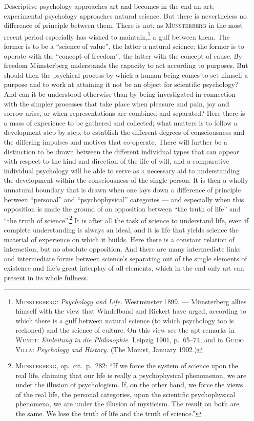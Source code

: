 \documentclass[12pt,a4paper]{book}
\newcommand{\opage}[1]{\marginnote{\footnotesize\textit{[#1]}}}
\begin{document}
Descriptive psychology approaches art and becomes in the end an art;
experimental psychology approaches natural science. But there is nevertheless no
difference of principle between them. There is not, as \textsc{Münsterberg} in
the most recent period especially has wished to maintain,\footnote{%
\textsc{Münsterberg}: \textit{Psychology and Life.} Westminster 1899. ---
Münsterberg allies himself with the view that Windelband and Rickert have
urged, according to which there is a gulf between natural science (to which
psychology too is reckoned) and the science of culture. On this view see the
apt remarks in \textsc{Wundt}: \textit{Einleitung in die Philosophie.} Leipzig
1901, p.~65--74, and in \textsc{Guido Villa}: \textit{Psychology and History.}
(The Monist, January 1902.)} a gulf between them. The former is to be a
``science of value'', the latter a natural science; the former is to operate
with the ``concept of freedom'', the latter with the concept of cause. By
freedom Münsterberg understands the capacity to act according to purposes. But
should then the psychical process by which a human being comes to set himself a
purpose and to work at attaining it not be an object for scientific psychology?
And can it be understood otherwise than by being investigated in connection with
the simpler processes that take place when pleasure and pain, joy and sorrow
arise, or when representations are combined and separated? Here there is a mass
of experience to be gathered and collected; what matters is to follow a
development step by step, to establish the different degrees of consciousness
and the differing impulses and motives that \opage{12}co-operate. There will further be a
distinction to be drawn between the different individual types that can appear
with respect to the kind and direction of the life of will, and a comparative
individual psychology will be able to serve as a necessary aid to understanding
the development within the consciousness of the single person. It is then a
wholly unnatural boundary that is drawn when one lays down a difference of
principle between ``personal'' and ``psychophysical'' categories --- and
especially when this opposition is made the ground of an opposition between
``the truth of life'' and ``the truth of science''.\footnote{%
\textsc{Münsterberg}, op.\ cit.\ p.~282: ``If we force the system of science
upon the real life, claiming that our life is really a psychophysical
\opage{86}phenomenon, we are under the illusion of psychologism. If, on the other hand, we
force the views of the real life, the personal categories, upon the scientific
psychophysical phenomena, we are under the illusion of mysticism. The result on
both are the same. We lose the truth of life and the truth of science.''} It is
after all the task of science to understand life, even if complete understanding
is always an ideal, and it is life that yields science the material of
experience on which it builds. Here there is a constant relation of interaction,
but no absolute opposition. And there are many intermediate links and
intermediate forms between science's separating out of the single elements of
existence and life's great interplay of all elements, which in the end only art
can present in its whole fullness.
\end{document}
